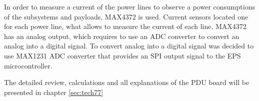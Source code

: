   In order to measure a current of the power lines to observe a power consumptions of the subsystems and payloads, MAX4372 is used. Current sensors located one for each power line, what allows to measure the current of each line. MAX4372 has an analog output, which requires to use an ADC converter to convert an analog into a digital signal. To convert analog into a digital signal was decided to use MAX1231 ADC converter that provides an SPI output signal to the EPS microcontroller. 
  
    
  The detailed review, calculations and all explanations of the PDU board will be presented in chapter \ref{sec:tech77}
  
    
  
    

    
  

  
  
  

